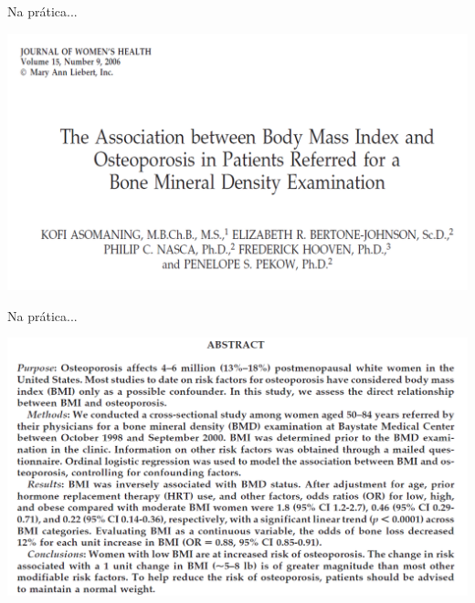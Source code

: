\documentclass{beamer}
\begin{document}
\begin{frame}{Na prática...}
  \begin{center}
    \includegraphics[width=\textwidth]{Cap18-19/bmi-bmd-title}
  \end{center}
\end{frame}

\begin{frame}{Na prática...}
  \begin{center}
    \includegraphics[width=1.175\textwidth]{Cap18-19/bmi-bmd-abstract}
  \end{center}
\end{frame}
\end{document}
